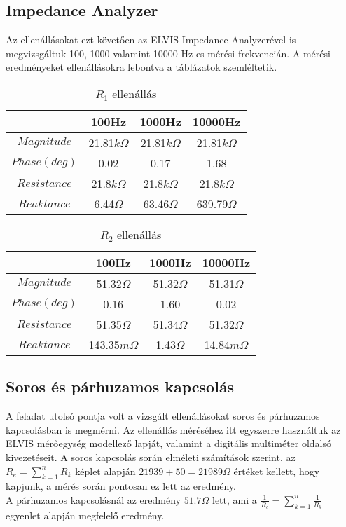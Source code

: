 \documentclass[10pt, conference,a4paper]{ITKproc}
\begin{document}
\subsection{Impedance Analyzer}
Az ellenállásokat ezt követően az ELVIS Impedance Analyzerével is megvizsgáltuk 100, 1000 valamint 10000 Hz-es mérési frekvencián. A mérési eredményeket ellenállásokra lebontva a táblázatok szemléltetik. 

\begin{table}[!t]
\renewcommand{\arraystretch}{1.3}
\caption{$R_1$ ellenállás}
\centering
\begin{tabular}{c||c||c||c}
\hline
\bfseries & \bfseries 100Hz & \bfseries 1000Hz & \bfseries 10000Hz\\
\hline\hline
$Magnitude$ & 21.81$k\Omega$ & 21.81$k\Omega$  & 21.81$k\Omega$\\
\hline
$Phase(deg)$ & 0.02 & 0.17  & 1.68\\
\hline
$Resistance$ & 21.8$k\Omega$ & 21.8$k\Omega$  & 21.8$k\Omega$\\
\hline
$Reaktance$ & 6.44$\Omega$ & 63.46$\Omega$  & 639.79$\Omega$\\
\hline
\end{tabular}
\end{table}

\begin{table}[!t]
\renewcommand{\arraystretch}{1.3}
\caption{$R_2$ ellenállás}
\centering
\begin{tabular}{c||c||c||c}
\hline
\bfseries & \bfseries 100Hz & \bfseries 1000Hz & \bfseries 10000Hz\\
\hline\hline
$Magnitude$ & 51.32$\Omega$ & 51.32$\Omega$  & 51.31$\Omega$\\
\hline
$Phase(deg)$ & 0.16 & 1.60  & 0.02\\
\hline
$Resistance$ & 51.35$\Omega$ & 51.34$\Omega$  & 51.32$\Omega$\\
\hline
$Reaktance$ & 143.35$m\Omega$ & 1.43$\Omega$  & 14.84$m\Omega$\\
\hline
\end{tabular}
\end{table}

\subsection{Soros és párhuzamos kapcsolás}
A feladat utolsó pontja volt a vizsgált ellenállásokat soros és párhuzamos kapcsolásban is megmérni. Az ellenállás méréséhez itt egyszerre használtuk az ELVIS mérőegység modellező lapját, valamint a digitális multiméter oldalsó kivezetéseit. A soros kapcsolás során elméleti számítások szerint, az $R_e = \sum_{k=1}^{n} R_k$ képlet alapján $21939+50=21989 \Omega$ értéket kellett, hogy kapjunk, a mérés során pontosan ez lett az eredmény. \\
A párhuzamos kapcsolásnál az eredmény $51.7\Omega$ lett, ami a $\frac{1}{R_e} = \sum_{k=1}^{n} \frac{1}{R_k}$ egyenlet alapján megfelelő eredmény. 
\end{document}
